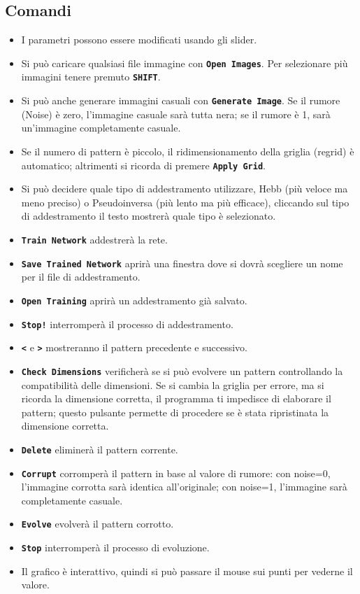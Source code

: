 \documentclass{article}
\newcommand{\kbd}[1]{\texttt{\textbf{#1}}}
\begin{document}
\subsection*{Comandi}
\begin{itemize}
    \item I parametri possono essere modificati usando gli slider.
    \item Si può caricare qualsiasi file immagine con \kbd{Open Images}. Per selezionare più immagini tenere premuto \kbd{SHIFT}.
    \item Si può anche generare immagini casuali con \kbd{Generate Image}. Se il rumore (Noise) è zero, l'immagine casuale sarà tutta nera; se il rumore è 1, sarà un'immagine completamente casuale.
    \item Se il numero di pattern è piccolo, il ridimensionamento della griglia (regrid) è automatico; altrimenti si ricorda di premere \kbd{Apply Grid}.
    \item Si può decidere quale tipo di addestramento utilizzare, Hebb (più veloce ma meno preciso) o Pseudoinversa (più lento ma più efficace), cliccando sul tipo di addestramento il testo mostrerà quale tipo è selezionato.
    \item \kbd{Train Network} addestrerà la rete.
    \item \kbd{Save Trained Network} aprirà una finestra dove si dovrà scegliere un nome per il file di addestramento.
    \item \kbd{Open Training} aprirà un addestramento già salvato.
    \item \kbd{Stop!} interromperà il processo di addestramento.
    \item \kbd{<} e \kbd{>} mostreranno il pattern precedente e successivo.
    \item \kbd{Check Dimensions} verificherà se si può evolvere un pattern controllando la compatibilità delle dimensioni. Se si cambia la griglia per errore, ma si ricorda la dimensione corretta, il programma ti impedisce di elaborare il pattern; questo pulsante permette di procedere se è stata ripristinata la dimensione corretta.
    \item \kbd{Delete} eliminerà il pattern corrente.
    \item \kbd{Corrupt} corromperà il pattern in base al valore di rumore: con noise=0, l'immagine corrotta sarà identica all'originale; con noise=1, l'immagine sarà completamente casuale.
    \item \kbd{Evolve} evolverà il pattern corrotto.
    \item \kbd{Stop} interromperà il processo di evoluzione.
    \item Il grafico è interattivo, quindi si può passare il mouse sui punti per vederne il valore.
\end{itemize}
\end{document}
